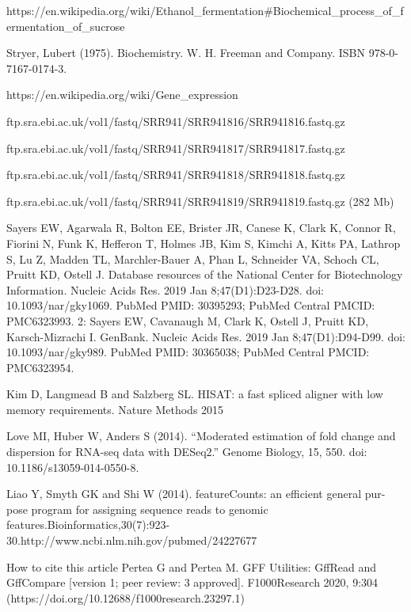 \documentclass{article}
\begin{document}
 
\begin{thebibliography}{9}
	 https://en.wikipedia.org/wiki/Ethanol_fermentation#Biochemical_process_of_fermentation_of_sucrose



	Stryer, Lubert (1975). Biochemistry. W. H. Freeman and Company. ISBN 978-0-7167-0174-3.
	
		https://en.wikipedia.org/wiki/Gene_expression
	
	

ftp.sra.ebi.ac.uk/vol1/fastq/SRR941/SRR941816/SRR941816.fastq.gz 

ftp.sra.ebi.ac.uk/vol1/fastq/SRR941/SRR941817/SRR941817.fastq.gz 

 ftp.sra.ebi.ac.uk/vol1/fastq/SRR941/SRR941818/SRR941818.fastq.gz 
 
 ftp.sra.ebi.ac.uk/vol1/fastq/SRR941/SRR941819/SRR941819.fastq.gz (282 Mb)

 Sayers EW, Agarwala R, Bolton EE, Brister JR, Canese K, Clark K, Connor R, Fiorini N, Funk K, Hefferon T, Holmes JB, Kim S, Kimchi A, Kitts PA, Lathrop S, Lu Z, Madden TL, Marchler-Bauer A, Phan L, Schneider VA, Schoch CL, Pruitt KD, Ostell J. Database resources of the National Center for Biotechnology Information. Nucleic Acids Res. 2019 Jan 8;47(D1):D23-D28. doi: 10.1093/nar/gky1069. PubMed PMID: 30395293; PubMed Central PMCID: PMC6323993. 2: Sayers EW, Cavanaugh M, Clark K, Ostell J, Pruitt KD, Karsch-Mizrachi I. GenBank. Nucleic Acids Res. 2019 Jan 8;47(D1):D94-D99. doi: 10.1093/nar/gky989. PubMed PMID: 30365038; PubMed Central PMCID: PMC6323954.
 
 
 
Kim D, Langmead B and Salzberg SL. HISAT: a fast spliced aligner with low memory requirements. Nature Methods 2015

Love MI, Huber W, Anders S (2014). “Moderated estimation of fold change and dispersion for RNA-seq data with DESeq2.” Genome Biology, 15, 550. doi: 10.1186/s13059-014-0550-8. 


Liao Y, Smyth GK and Shi W (2014).  featureCounts:  an efficient general pur-pose program for assigning sequence reads to genomic features.Bioinformatics,30(7):923-30.http://www.ncbi.nlm.nih.gov/pubmed/24227677

How to cite this article
Pertea G and Pertea M. GFF Utilities: GffRead and GffCompare [version 1; peer review: 3 approved]. F1000Research 2020, 9:304 (https://doi.org/10.12688/f1000research.23297.1) 


\end{thebibliography}
\end{document}
